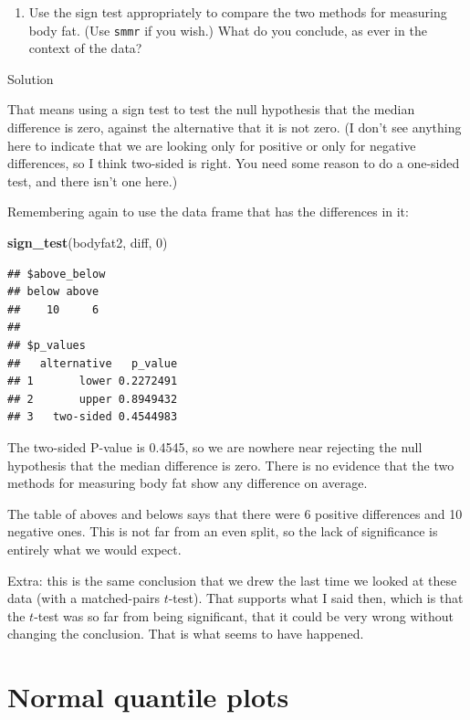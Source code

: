 \documentclass[]{tufte-book}
\newenvironment{Shaded}{}{}
\newcommand{\DecValTok}[1]{\textcolor[rgb]{0.25,0.63,0.44}{#1}}
\newcommand{\KeywordTok}[1]{\textcolor[rgb]{0.00,0.44,0.13}{\textbf{#1}}}
\newcommand{\NormalTok}[1]{#1}
\providecommand{\tightlist}{%
  \setlength{\itemsep}{0pt}\setlength{\parskip}{0pt}}
\theoremstyle{definition}
\theoremstyle{definition}
\theoremstyle{definition}
\theoremstyle{remark}
\begin{document}
\begin{enumerate}
\def\labelenumi{(\alph{enumi})}
\setcounter{enumi}{3}
\tightlist
\item
  Use the sign test appropriately to compare the two methods for
  measuring body fat. (Use \texttt{smmr} if you wish.) What do you
  conclude, as ever in the context of the data?
\end{enumerate}

Solution

That means using a sign test to test the null hypothesis that the median
difference is zero, against the alternative that it is not zero. (I
don't see anything here to indicate that we are looking only for
positive or only for negative differences, so I think two-sided is
right. You need some reason to do a one-sided test, and there isn't one
here.)

Remembering again to use the data frame that has the differences in it:

\begin{Shaded}
\begin{Highlighting}[]
\KeywordTok{sign_test}\NormalTok{(bodyfat2, diff, }\DecValTok{0}\NormalTok{)}
\end{Highlighting}
\end{Shaded}

\begin{verbatim}
## $above_below
## below above 
##    10     6 
## 
## $p_values
##   alternative   p_value
## 1       lower 0.2272491
## 2       upper 0.8949432
## 3   two-sided 0.4544983
\end{verbatim}

The two-sided P-value is 0.4545, so we are nowhere near rejecting the
null hypothesis that the median difference is zero. There is no evidence
that the two methods for measuring body fat show any difference on
average.

The table of aboves and belows says that there were 6 positive
differences and 10 negative ones. This is not far from an even split, so
the lack of significance is entirely what we would expect.

Extra: this is the same conclusion that we drew the last time we looked
at these data (with a matched-pairs \(t\)-test). That supports what I
said then, which is that the \(t\)-test was so far from being
significant, that it could be very wrong without changing the
conclusion. That is what seems to have happened.

\hypertarget{normal-quantile-plots}{%
\chapter{Normal quantile plots}\label{normal-quantile-plots}}
\end{document}
